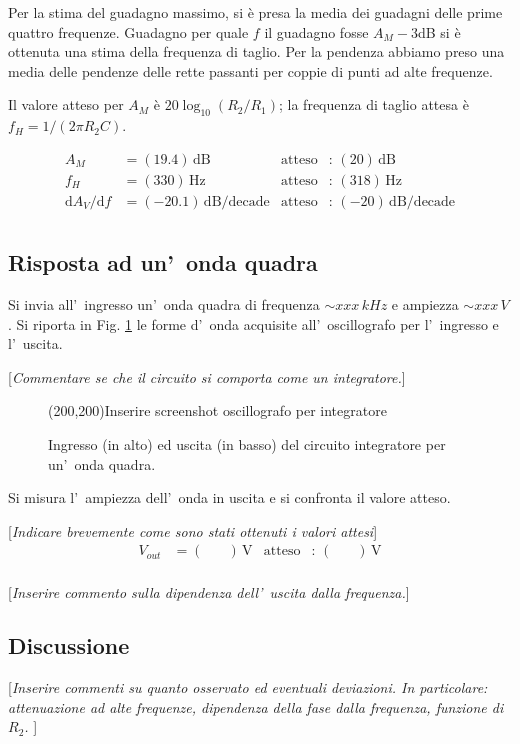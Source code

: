 \documentclass[10pt,a4paper]{article}
\newcommand{\rem}[1]{[\emph{#1}]}
\newcommand{\exn}{\phantom{xxx}}
\begin{document}
	Per la stima del guadagno massimo, si è presa la media dei guadagni delle prime quattro frequenze.
	Guadagno per quale $f$ il guadagno fosse  $A_M - 3 $dB si è ottenuta una stima della frequenza di taglio.
	Per la pendenza abbiamo preso una media delle pendenze delle rette passanti per coppie di punti ad alte frequenze.

	Il valore atteso per $A_M $ è $ 20 \log_{10}(R_2/R_1)$; la frequenza di taglio attesa è $f_H = 1/(2\pi R_2 C)$.

	
	\begin{align*}
	A_M &= (19.4 )\,\mathrm{dB} & \mathrm{atteso} &:\,(20  )\, \mathrm{dB}  \\
	f_H &= (330 )\,\mathrm{Hz} & \mathrm{atteso} &:\,(318  )\, \mathrm{Hz} \\
	{\mathrm{d}A_V}/{\mathrm{d}f} &= (-20.1 )\,\mathrm{dB/decade} & \mathrm{atteso} &:\,(-20  )\, \mathrm{dB/decade}  \\
	\end{align*}
	
	
	\subsection*{Risposta ad un'~onda quadra}
	Si invia all'~ingresso un'~onda quadra di frequenza $\sim xxx\,kHz$ e ampiezza $\sim xxx\,V$.
	Si riporta in Fig. \ref{fig:oscinte} le forme d'~onda acquisite all'~oscillografo per l'~ingresso
	e l'~uscita. 
	
	\rem{Commentare se che il circuito si comporta come un integratore.}
	\begin{figure}[htb]
		\begin{center}
			\framebox(200,200){Inserire screenshot oscillografo per integratore}
		\end{center}
		\caption{\small Ingresso (in alto) ed uscita (in basso) del circuito integratore per un'~onda quadra.}
		\label{fig:oscinte}
	\end{figure}
	
	Si misura l'~ampiezza dell'~onda  in uscita e si confronta il valore atteso.
	
	\rem{Indicare brevemente come sono stati ottenuti i valori attesi}
	\begin{align*}
	V_{out} &= (\exn )\,\mathrm{V} & \mathrm{atteso} &:\,(\exn  )\, \mathrm{V}  \\
	\end{align*}
	
	\rem{Inserire commento sulla dipendenza dell'~uscita dalla frequenza.}
	
	\subsection{Discussione}
	
	\rem{Inserire commenti su quanto osservato ed eventuali deviazioni. 
		In particolare: attenuazione ad alte frequenze, dipendenza della fase dalla frequenza, funzione di $R_2$. }
	
	\begin{tabular}{cc}

\end{tabular}
\end{document}
